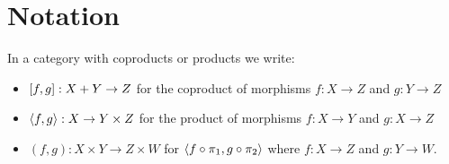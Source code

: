 \section{Notation}

In a category with coproducts or products we write:
\begin{itemize}
\item $[f, g]: X + Y \to Z$ for the coproduct of morphisms $f: X \to Z$ and $g: Y \to Z$
\item $\langle f, g\rangle: X \to Y \times Z$ for the product of morphisms $f: X \to Y$ and $g: X \to Z$
\item $(f,g): X \times Y \to Z \times W$ for $\langle f \circ \pi_1, g \circ \pi_2\rangle$ where $f: X \to Z$ and $g: Y \to W$.
\end{itemize}
